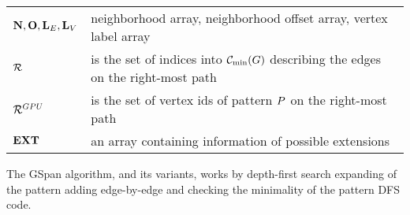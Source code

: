 \begin{tabular}{lp{13cm}}
$\mathbf{N}, \mathbf{O}, \mathbf{L}_E, \mathbf{L}_V$   & neighborhood array, neighborhood offset array, vertex label array \\
$\mathcal{R}$                & is the set of indices into $\mindfscode(\G)$ describing the edges on the right-most path \\
$\mathcal{R}^{GPU}$           & is the set of vertex ids of pattern $P$ on the right-most path \\
$\mathbf{EXT}$        & an array containing information of possible extensions \\
\end{tabular}

\bigskip


\bigskip


\bigskip

\bigskip


\bigskip


The GSpan algorithm, and its variants, works by depth-first search expanding of the pattern adding
edge-by-edge and checking the minimality of the pattern DFS code. 


\bigskip


